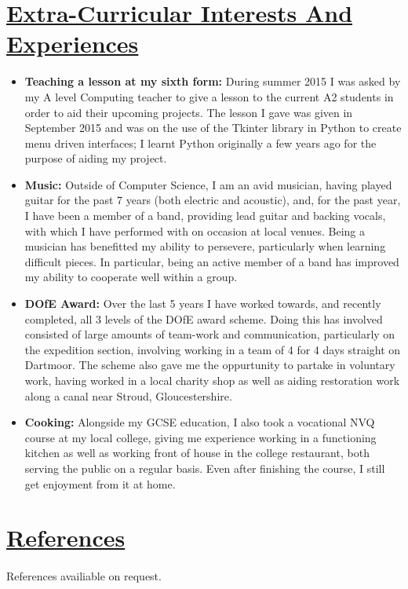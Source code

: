 \documentclass[11pt]{article}
\begin{document}
	\vspace{-3pt}
	\hspace{-100pt}\section*{\underline{Extra-Curricular Interests And Experiences}}
			\begin{itemize}
				\item \textbf{Teaching a lesson at my sixth form:} During summer 2015 I was asked by my A level Computing teacher to give a lesson to the current A2 students in order to aid their upcoming projects. The lesson I gave was given in September 2015 and was on the use of the Tkinter library in Python to create menu driven interfaces; I learnt Python originally a few years ago for the purpose of aiding my project.
				\item \textbf{Music:} Outside of Computer Science, I am an avid musician, having played guitar for the past 7 years (both electric and acoustic), and, for the past year, I have been a member of a band, providing lead guitar and backing vocals, with which I have performed with on occasion at local venues. Being a musician has benefitted my ability to persevere, particularly when learning difficult pieces. In particular, being an active member of a band has improved my ability to cooperate well within a group. 
				\item \textbf{DOfE Award:} Over the last 5 years I have worked towards, and recently completed, all 3 levels of the DOfE award scheme. Doing this has involved consisted of large amounts of team-work and communication, particularly on the expedition section, involving working in a team of 4 for 4 days straight on Dartmoor. The scheme also gave me the oppurtunity to partake in voluntary work, having worked in a local charity shop as well as aiding restoration work along a canal near Stroud, Gloucestershire.
				\item \textbf{Cooking:} Alongside my GCSE education, I also took a vocational NVQ course at my local college, giving me experience working in a functioning kitchen as well as working front of house in the college restaurant, both serving the public on a regular basis. Even after finishing the course, I still get enjoyment from it at home.
			\end{itemize}
				
	\vspace{-3pt}
	\hspace{-100pt}\section*{\underline{References}}
			\paragraph{}
				References availiable on request.
				
\end{document}
